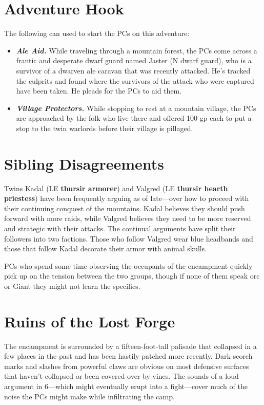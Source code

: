 \documentclass[10pt,a4paper,twoside,bg=print,twocolumn,openany,nodeprecatedcode]{dndbook}
\begin{document}
\section{Adventure Hook}
The following can used to start the PCs on this adventure:


\begin{itemize}
\item \textbf{\textit{Ale Aid.}} While traveling through a mountain forest, the PCs come across a frantic and desperate dwarf guard named Jaster (N dwarf guard), who is a survivor of a dwarven ale caravan that was recently attacked. He's tracked the culprits and found where the survivors of the attack who were captured have been taken. He pleads for the PCs to aid them.
\item \textbf{\textit{Village Protectors.}} While stopping to rest at a mountain village, the PCs are approached by the folk who live there and offered 100 gp each to put a stop to the twin warlords before their village is pillaged.
\end{itemize}

\section{Sibling Disagreements}
Twins Kadal (LE \textbf{thursir armorer}) and Valgred (LE \textbf{thursir hearth priestess}) have been frequently arguing as of late—over how to proceed with their continuing conquest of the mountains. Kadal believes they should push forward with more raids, while Valgred believes they need to be more reserved and strategic with their attacks. The continual arguments have split their followers into two factions. Those who follow Valgred wear blue headbands and those that follow Kadal decorate their armor with animal skulls.

PCs who spend some time observing the occupants of the encampment quickly pick up on the tension between the two groups, though if none of them speak orc or Giant they might not learn the specifics.

\section{Ruins of the Lost Forge}
The encampment is surrounded by a fifteen-foot-tall palisade that collapsed in a few places in the past and has been hastily patched more recently. Dark scorch marks and slashes from powerful claws are obvious on most defensive surfaces that haven't collapsed or been covered over by vines. The sounds of a loud argument in 6—which might eventually erupt into a fight—cover much of the noise the PCs might make while infiltrating the camp.
\end{document}
